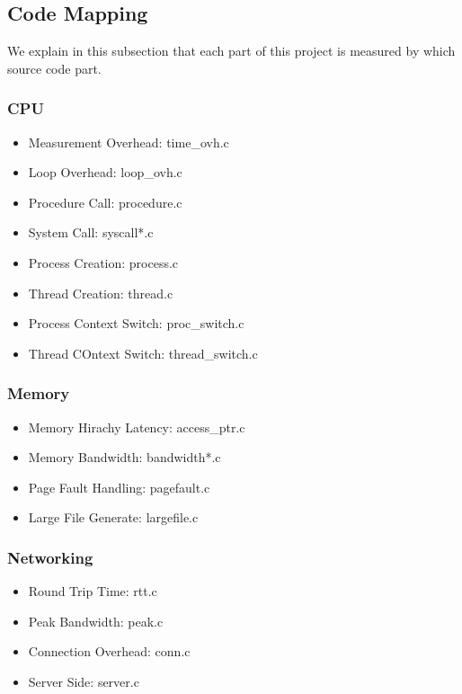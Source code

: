 \subsection{Code Mapping}

We explain in this subsection that each part of this project is measured by which source code part.

\subsubsection{CPU}
\begin{itemize}
    \item Measurement Overhead: time\_ovh.c
    \item Loop Overhead: loop\_ovh.c
    \item Procedure Call: procedure.c
    \item System Call: syscall*.c
    \item Process Creation: process.c
    \item Thread Creation: thread.c
    \item Process Context Switch: proc\_switch.c
    \item Thread COntext Switch: thread\_switch.c
\end{itemize}

\subsubsection{Memory}
\begin{itemize}
    \item Memory Hirachy Latency: access\_ptr.c
    \item Memory Bandwidth: bandwidth*.c
    \item Page Fault Handling: pagefault.c
    \item Large File Generate: largefile.c
\end{itemize}

\subsubsection{Networking}
\begin{itemize}
    \item Round Trip Time: rtt.c
    \item Peak Bandwidth: peak.c
    \item Connection Overhead: conn.c
    \item Server Side: server.c
\end{itemize}

